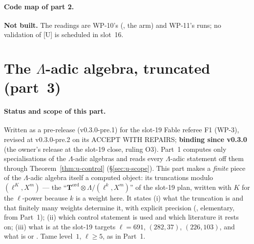\documentclass[11pt]{article}
\newcommand{\Iw}{\Lambda}                         %
\begin{document}
\paragraph{Code map of part 2.} \textbf{Not built.} The readings are WP-10's (, the  arm) and WP-11's runs; no
validation of [U] is scheduled in slot~16.

\section{The \texorpdfstring{$\Iw$}{Lambda}-adic algebra, truncated (part~3)}\label{sec:u-lambda}

\paragraph{Status and scope of this part.} Written as a pre-release (v0.3.0-pre.1) for the slot-19 Fable referee F1 (WP-3), revised at v0.3.0-pre.2 on its ACCEPT WITH REPAIRS; \textbf{binding
since v0.3.0} (the owner's release at the slot-19 close, ruling O3). Part~1 computes only specialisations of the $\Iw$-adic algebras and reads every $\Iw$-adic statement off
them through Theorem~\ref{thm:u-control} (\S\ref{sec:u-scope}). This part makes a \emph{finite} piece of the $\Iw$-adic algebra itself a computed
object: its truncations modulo $(\ell^{K},X^{m})$ --- the ``$\mathbf T^{\mathrm{ord}}\otimes\Iw/(\ell^{k},X^{m})$'' of the slot-19 plan, written
with $K$ for the $\ell$-power because $k$ is a weight here. It states (i) what the truncation is and that finitely many weights determine it,
with explicit precision (\PROVED, elementary, from Part~1); (ii) which control statement is used and which literature it rests on;
(iii) what is \PROVED{} at the slot-19 targets $\ell=691$, $(282,37)$, $(226,103)$, and what is \COMP{} or \CONJ. Tame level~$1$, $\ell\ge5$, as in Part~1.
\end{document}
